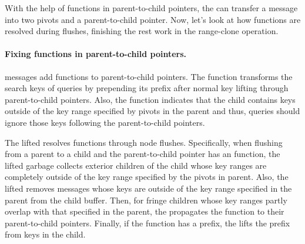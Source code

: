 With the help of \xf functions in parent-to-child pointers,
the \bedag can transfer a \goto message into two pivots and a parent-to-child
pointer.
Now, let's look at how \xf functions are resolved during flushes,
finishing the rest work in the range-clone operation.

\paragraph{Fixing \xf functions in parent-to-child pointers.}
\goto messages add \xf functions to parent-to-child pointers.
The \xf function transforms the search keys of queries by prepending its prefix
after normal key lifting through parent-to-child pointers.
Also, the \xf function indicates that
the child contains keys outside of the key range
specified by pivots in the parent and
thus, queries should ignore those keys following
the parent-to-child pointers.

The lifted \bedag resolves \xf functions through node flushes.
Specifically, when flushing from a parent to a child and the parent-to-child
pointer has an \xf function,
the lifted \bedag garbage collects exterior children of the child whose key
ranges are completely outside of the key range specified by the pivots in parent.
Also, the lifted \bedag removes messages whose keys are outside of the key
range specified in the parent from the child buffer.
Then, for fringe children whose key ranges partly overlap with that specified
in the parent, the \bedag propagates the \xf function to their parent-to-child
pointers.
Finally, if the \xf function has a prefix, the \bedag lifts the prefix from
keys in the child.

